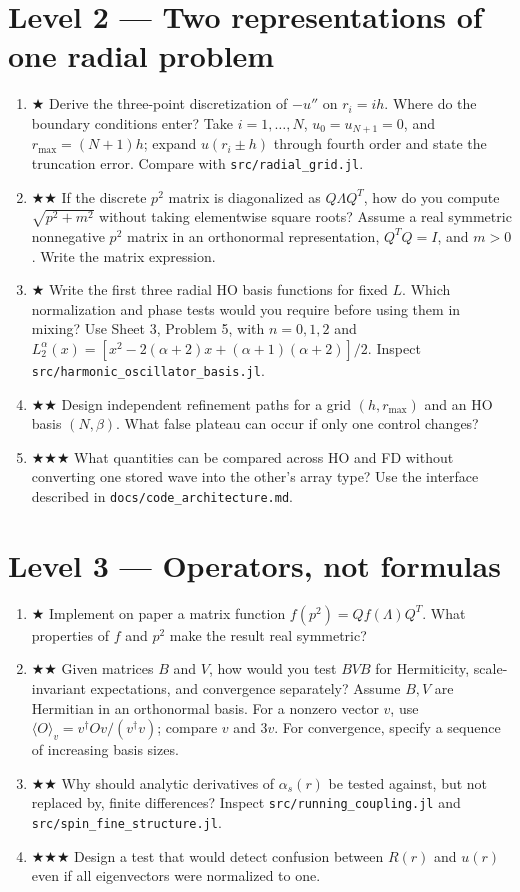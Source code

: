 \documentclass[11pt]{article}
\begin{document}
\section*{Level 2 — Two representations of one radial problem}
\begin{enumerate}[resume]
\item ★ Derive the three-point discretization of $-u''$ on $r_i=ih$. Where do
the boundary conditions enter? Take $i=1,\ldots,N$,
$u_0=u_{N+1}=0$, and $r_{\max}=(N+1)h$; expand $u(r_i\pm h)$ through
fourth order and state the truncation error. Compare with \texttt{src/radial\_grid.jl}.
\item ★★ If the discrete $p^2$ matrix is diagonalized as $Q\Lambda Q^T$, how do
you compute $\sqrt{p^2+m^2}$ without taking elementwise square roots?
Assume a real symmetric nonnegative $p^2$ matrix in an orthonormal
representation, $Q^TQ=I$, and $m>0$. Write the matrix expression.
\item ★ Write the first three radial HO basis functions for fixed $L$. Which
normalization and phase tests would you require before using them in mixing?
Use Sheet 3, Problem 5, with $n=0,1,2$ and
$L_2^\alpha(x)=[x^2-2(\alpha+2)x+(\alpha+1)(\alpha+2)]/2$.
Inspect \texttt{src/harmonic\_oscillator\_basis.jl}.
\item ★★ Design independent refinement paths for a grid $(h,r_{\max})$ and an
HO basis $(N,\beta)$. What false plateau can occur if only one control changes?
\item ★★★ What quantities can be compared across HO and FD without converting
one stored wave into the other's array type? Use the interface described in
\texttt{docs/code\_architecture.md}.
\end{enumerate}

\section*{Level 3 — Operators, not formulas}
\begin{enumerate}[resume]
\item ★ Implement on paper a matrix function $f(p^2)=Qf(\Lambda)Q^T$. What
properties of $f$ and $p^2$ make the result real symmetric?
\item ★★ Given matrices $B$ and $V$, how would you test $BVB$ for Hermiticity,
scale-invariant expectations, and convergence separately?
Assume $B,V$ are Hermitian in an orthonormal basis. For a nonzero vector $v$,
use $\langle O\rangle_v=v^\dagger Ov/(v^\dagger v)$; compare $v$ and $3v$.
For convergence, specify a sequence of increasing basis sizes.
\item ★★ Why should analytic derivatives of $\alpha_s(r)$ be tested against,
but not replaced by, finite differences? Inspect
\texttt{src/running\_coupling.jl} and \texttt{src/spin\_fine\_structure.jl}.
\item ★★★ Design a test that would detect confusion between $R(r)$ and $u(r)$
even if all eigenvectors were normalized to one.
\end{enumerate}
\end{document}
